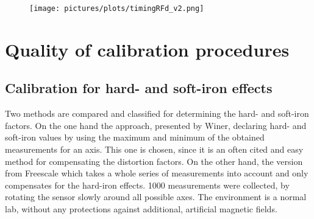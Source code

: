 \begin{figure}[h]
\centering
\texttt{[image: pictures/plots/timingRFd\_v2.png]}
\caption{}
\label{fig:sensTime}
\end{figure}




\section{Quality of calibration procedures} \label{sec:cali}

\subsection{Calibration for hard- and soft-iron effects}\label{subsec:resHardSoft}

Two methods are compared and classified for determining the hard- and soft-iron factors. On the one hand the approach, presented by Winer, declaring hard- and soft-iron values by using the maximum and minimum of the obtained measurements for an axis. This one is chosen, since it is an often cited and easy method for compensating the distortion factors. On the other hand, the version from Freescale \cite{ozyagcilar2012calibrating} which takes a whole series of measurements into account and only compensates for the hard-iron effects. 1000 measurements were collected, by rotating the sensor slowly around all possible axes. The environment is a normal lab, without any protections against additional, artificial magnetic fields. 

